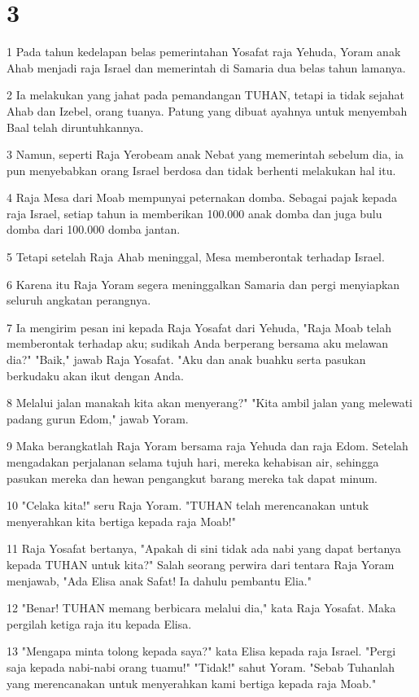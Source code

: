 \chapter{3}

\par 1 Pada tahun kedelapan belas pemerintahan Yosafat raja Yehuda, Yoram anak Ahab menjadi raja Israel dan memerintah di Samaria dua belas tahun lamanya.
\par 2 Ia melakukan yang jahat pada pemandangan TUHAN, tetapi ia tidak sejahat Ahab dan Izebel, orang tuanya. Patung yang dibuat ayahnya untuk menyembah Baal telah diruntuhkannya.
\par 3 Namun, seperti Raja Yerobeam anak Nebat yang memerintah sebelum dia, ia pun menyebabkan orang Israel berdosa dan tidak berhenti melakukan hal itu.
\par 4 Raja Mesa dari Moab mempunyai peternakan domba. Sebagai pajak kepada raja Israel, setiap tahun ia memberikan 100.000 anak domba dan juga bulu domba dari 100.000 domba jantan.
\par 5 Tetapi setelah Raja Ahab meninggal, Mesa memberontak terhadap Israel.
\par 6 Karena itu Raja Yoram segera meninggalkan Samaria dan pergi menyiapkan seluruh angkatan perangnya.
\par 7 Ia mengirim pesan ini kepada Raja Yosafat dari Yehuda, "Raja Moab telah memberontak terhadap aku; sudikah Anda berperang bersama aku melawan dia?" "Baik," jawab Raja Yosafat. "Aku dan anak buahku serta pasukan berkudaku akan ikut dengan Anda.
\par 8 Melalui jalan manakah kita akan menyerang?" "Kita ambil jalan yang melewati padang gurun Edom," jawab Yoram.
\par 9 Maka berangkatlah Raja Yoram bersama raja Yehuda dan raja Edom. Setelah mengadakan perjalanan selama tujuh hari, mereka kehabisan air, sehingga pasukan mereka dan hewan pengangkut barang mereka tak dapat minum.
\par 10 "Celaka kita!" seru Raja Yoram. "TUHAN telah merencanakan untuk menyerahkan kita bertiga kepada raja Moab!"
\par 11 Raja Yosafat bertanya, "Apakah di sini tidak ada nabi yang dapat bertanya kepada TUHAN untuk kita?" Salah seorang perwira dari tentara Raja Yoram menjawab, "Ada Elisa anak Safat! Ia dahulu pembantu Elia."
\par 12 "Benar! TUHAN memang berbicara melalui dia," kata Raja Yosafat. Maka pergilah ketiga raja itu kepada Elisa.
\par 13 "Mengapa minta tolong kepada saya?" kata Elisa kepada raja Israel. "Pergi saja kepada nabi-nabi orang tuamu!" "Tidak!" sahut Yoram. "Sebab Tuhanlah yang merencanakan untuk menyerahkan kami bertiga kepada raja Moab."

